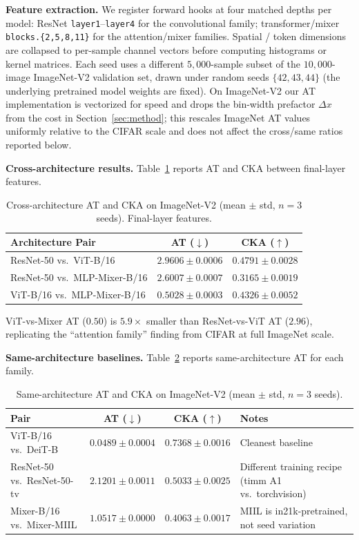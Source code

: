 \documentclass{article}
\begin{document}
\textbf{Feature extraction.} We register forward hooks at four matched depths per model: ResNet \texttt{layer1}--\texttt{layer4} for the convolutional family; transformer/mixer \texttt{blocks.\{2,5,8,11\}} for the attention/mixer families. Spatial / token dimensions are collapsed to per-sample channel vectors before computing histograms or kernel matrices. Each seed uses a different $5{,}000$-sample subset of the $10{,}000$-image ImageNet-V2 validation set, drawn under random seeds $\{42, 43, 44\}$ (the underlying pretrained model weights are fixed). On ImageNet-V2 our AT implementation is vectorized for speed and drops the bin-width prefactor $\Delta x$ from the cost in Section~\ref{sec:method}; this rescales ImageNet AT values uniformly relative to the CIFAR scale and does not affect the cross/same ratios reported below.

\textbf{Cross-architecture results.} Table~\ref{tab:imagenet_cross} reports AT and CKA between final-layer features.

\begin{table}[t]
\caption{Cross-architecture AT and CKA on ImageNet-V2 (mean $\pm$ std, $n{=}3$ seeds). Final-layer features.}
\label{tab:imagenet_cross}
\centering
\small
\begin{tabular}{@{}lcc@{}}
\toprule
Architecture Pair & AT ($\downarrow$) & CKA ($\uparrow$) \\
\midrule
ResNet-50 vs.\ ViT-B/16     & $2.9606 \pm 0.0006$ & $0.4791 \pm 0.0028$ \\
ResNet-50 vs.\ MLP-Mixer-B/16 & $2.6007 \pm 0.0007$ & $0.3165 \pm 0.0019$ \\
ViT-B/16 vs.\ MLP-Mixer-B/16  & $0.5028 \pm 0.0003$ & $0.4326 \pm 0.0052$ \\
\bottomrule
\end{tabular}
\end{table}

ViT-vs-Mixer AT ($0.50$) is $5.9\times$ smaller than ResNet-vs-ViT AT ($2.96$), replicating the ``attention family'' finding from CIFAR at full ImageNet scale.

\textbf{Same-architecture baselines.} Table~\ref{tab:imagenet_same} reports same-architecture AT for each family.

\begin{table}[t]
\caption{Same-architecture AT and CKA on ImageNet-V2 (mean $\pm$ std, $n{=}3$ seeds).}
\label{tab:imagenet_same}
\centering
\small
\begin{tabular}{@{}lccp{4cm}@{}}
\toprule
Pair & AT ($\downarrow$) & CKA ($\uparrow$) & Notes \\
\midrule
ViT-B/16 vs.\ DeiT-B & $\mathbf{0.0489 \pm 0.0004}$ & $0.7368 \pm 0.0016$ & Cleanest baseline \\
ResNet-50 vs.\ ResNet-50-tv & $2.1201 \pm 0.0011$ & $0.5033 \pm 0.0025$ & Different training recipe (timm A1 vs.\ torchvision) \\
Mixer-B/16 vs.\ Mixer-MIIL & $1.0517 \pm 0.0000$ & $0.4063 \pm 0.0017$ & MIIL is in21k-pretrained, not seed variation \\
\bottomrule
\end{tabular}
\end{table}
\end{document}
